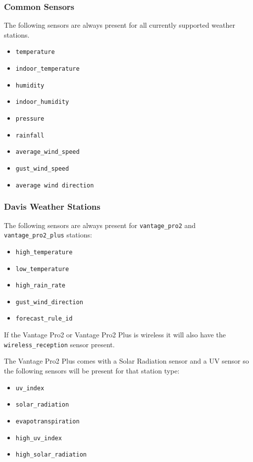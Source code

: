 \documentclass[a4paper,10pt]{book}
\begin{document}
\subsubsection{Common Sensors}
The following sensors are always present for all currently supported weather stations.
\begin{itemize}
\item \verb|temperature|
\item \verb|indoor_temperature|
\item \verb|humidity|
\item \verb|indoor_humidity|
\item \verb|pressure|
\item \verb|rainfall|
\item \verb|average_wind_speed|
\item \verb|gust_wind_speed|
\item \verb|average wind direction|
\end{itemize}

\subsubsection{Davis Weather Stations}
The following sensors are always present for \verb|vantage_pro2| and \verb|vantage_pro2_plus| stations:
\begin{itemize}
\item \verb|high_temperature|
\item \verb|low_temperature|
\item \verb|high_rain_rate|
\item \verb|gust_wind_direction|
\item \verb|forecast_rule_id|
\end{itemize}

If the Vantage Pro2 or Vantage Pro2 Plus is wireless it will also have the \verb|wireless_reception| sensor present.

The Vantage Pro2 Plus comes with a Solar Radiation sensor and a UV sensor so the following sensors will be present for that station type:
\begin{itemize}
\item \verb|uv_index|
\item \verb|solar_radiation|
\item \verb|evapotranspiration|
\item \verb|high_uv_index|
\item \verb|high_solar_radiation|
\end{itemize}
\end{document}
